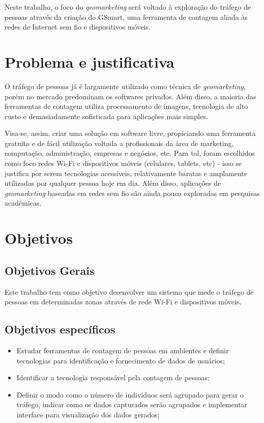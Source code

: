 Neste trabalho, o foco do \emph{geomarketing} será voltado à exploração do tráfego
de pessoas através da criação do GSmart, uma ferramenta de contagem aliada às redes de
Internet sem fio e dispositivos móveis.

\section{Problema e justificativa}
O tráfego de pessoas já é largamente utilizado como técnica de \emph{geomarketing}, porém
no mercado predominam os softwares privados. Além disso, a maioria das ferramentas de contagem utiliza processamento de imagens, tecnologia de alto custo e demasiadamente sofisticada para aplicações mais simples. 

Visa-se, assim, criar uma solução em software livre, propiciando uma ferramenta gratuita e de fácil utilização voltada a profissionais da área de marketing, computação, administração, empresas e negócios, etc. Para tal, foram escolhidos como foco redes Wi-Fi e dispositivos móveis (celulares, tablets, etc) - isso se justifica por serem tecnologias acessíveis, relativamente baratas e amplamente utilizadas por qualquer pessoa hoje em dia. Além disso, aplicações de \emph{geomarketing} baseadas em redes sem fio são ainda pouco exploradas em pesquisas acadêmicas.

\section{Objetivos}
\label{objetivos}

\subsection{Objetivos Gerais}
Este trabalho tem como objetivo desenvolver um sistema que mede o tráfego de
pessoas em determinadas zonas através de rede Wi-Fi e dispositivos móveis.

\subsection{Objetivos específicos}
\begin{itemize}
  \item Estudar ferramentas de contagem de pessoas em ambientes e definir tecnologias para identificação e fornecimento de dados de usuários;
  \item Identificar a tecnologia responsável pela contagem de pessoas;
  \item Definir o modo como o número de indivíduos será agrupado para gerar o tráfego, indicar como os dados capturados serão agrupados e implementar interface para visualização dos dados gerados;
\end{itemize}

